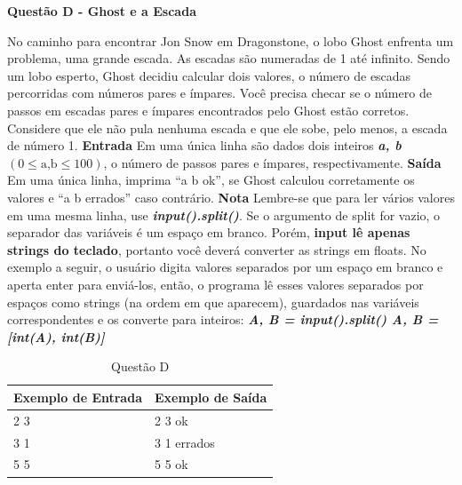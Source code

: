 \documentclass[a4paper, 12pt]{article}
\begin{document}
\newpage %
\begin{center}
\textbf{{\Large Questão D - Ghost e a Escada}}
\end{center}
\vspace{5pt}
No caminho para encontrar Jon Snow em Dragonstone, o lobo Ghost enfrenta um problema, uma grande escada. As escadas são numeradas de 1 até infinito. Sendo um lobo esperto, Ghost decidiu calcular dois valores, o número de escadas percorridas com números pares e ímpares. \newline \newline
Você precisa checar se o número de passos em escadas pares e ímpares encontrados pelo Ghost estão corretos. Considere que ele não pula nenhuma escada e que ele sobe, pelo menos, a escada de número 1. 
\newline \newline
\textbf{{\large Entrada}} \newline
Em uma única linha são dados dois inteiros \textit{\textbf{a, b}} $(0 \leq \textrm{a,b} \leq 100)$, o número de passos pares e ímpares, respectivamente. 
\newline \newline
\textbf{{\large Saída}} \newline
Em uma única linha, imprima ``a b ok'', se Ghost calculou corretamente os valores e ``a b errados'' caso contrário.
\newline \newline
\textbf{{\large Nota}} \newline
Lembre-se que para ler vários valores em uma mesma linha, use \textbf{\textit{input().split()}}. Se o argumento de split for vazio, o separador das variáveis é um espaço em branco. Porém, \textbf{input lê apenas strings do teclado}, portanto você deverá converter as strings em floats. No exemplo a seguir, o usuário digita valores separados por um espaço em branco e aperta enter para enviá-los, então, o programa lê esses valores separados por espaços como strings (na ordem em que aparecem), guardados nas variáveis correspondentes e os converte para inteiros: \newline
\textbf{\textit{A, B = input().split() \newline
A, B = [int(A), int(B)]}}
\newline
\begin{table}[H]
	\centering
	\begin{tabular}{|l|l|}
	\hline
	\textbf{Exemplo de Entrada} & \textbf{Exemplo de Saída} \\ \hline
	2 3 & 2 3 ok \\ \hline
	3 1 & 3 1 errados \\ \hline
	5 5 & 5 5 ok \\ \hline
	\end{tabular}
	\caption{Questão D}
	\label{tabela4}
\end{table}
\end{document}
